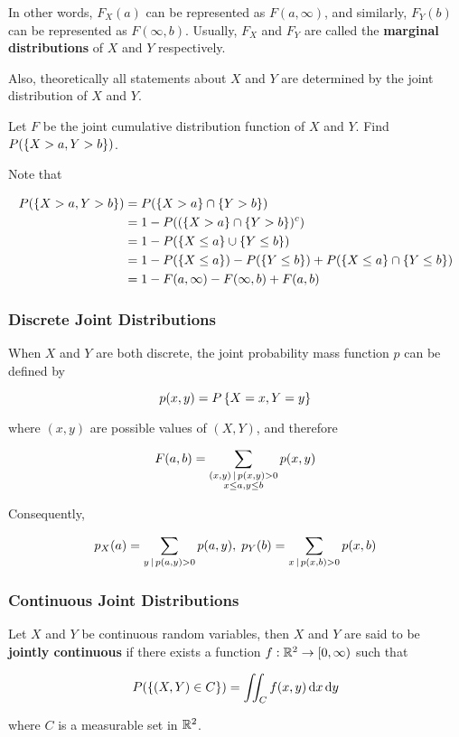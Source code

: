 \documentclass[a4paper,12pt]{article}
\begin{document}
In other words, $F_{X}(a)$ can be represented as $F(a,\infty)$, and similarly, $F_{Y}(b)$ can be represented as $F(\infty,b)$. Usually, $F_{X}$ and $F_{Y}$ are called the \textbf{marginal distributions} of $X$ and $Y$ respectively.\n

Also, theoretically all statements about $X$ and $Y$ are determined by the joint distribution of $X$ and $Y$.\n

\begin{exm}
  Let $F$ be the joint cumulative distribution function of $X$ and $Y$. Find $P(\left\{ X>a,Y>b\right\})$.\n

  \ans Note that

  $$\begin{aligned}[t]
    P(\left\{ X>a,Y>b\right\})&=P(\left\{ X>a\right\}\cap\left\{ Y>b\right\})\\
    &=1-P((\left\{ X>a\right\}\cap\left\{ Y>b\right\})^{c})\\
    &=1-P(\left\{ X\leq a\right\}\cup\left\{ Y\leq b\right\})\\
    &=1-P(\left\{ X\leq a\right\})-P(\left\{ Y\leq b\right\})+P(\left\{ X\leq a\right\}\cap\left\{ Y\leq b\right\})\\
    &=1-F(a,\infty)-F(\infty,b)+F(a,b)
  \end{aligned}$$
\end{exm}\n

\subsubsection{Discrete Joint Distributions}
When $X$ and $Y$ are both discrete, the joint probability mass function $p$ can be defined by

$$p(x,y)=P\left\{ X=x,Y=y\right\}$$\s

where $(x,y)$ are possible values of $(X,Y)$, and therefore

$$F(a,b)=\sum_{\substack{(x,y)\,\mid\, p(x,y)>0\\x\leq a,y\leq b}}p(x,y)$$\s

Consequently,

$$p_{X}(a)=\sum_{y\,\mid\, p(a,y)>0}p(a,y),\;p_{Y}(b)=\sum_{x\,\mid\, p(x,b)>0}p(x,b)$$\s

\subsubsection{Continuous Joint Distributions}
\begin{dft}
  Let $X$ and $Y$ be continuous random variables, then $X$ and $Y$ are said to be \textbf{jointly continuous} if there exists a function $f:\mathbb{R}^{2}\to[0,\infty)$ such that

  $$P(\left\{ (X,Y)\in C\right\})=\iint_{C}f(x,y)\,\mathrm{d} x\,\mathrm{d} y$$\s
  
  where $C$ is a measurable set in $\mathbb{R}^{2}$.
\end{dft}\n
\end{document}
